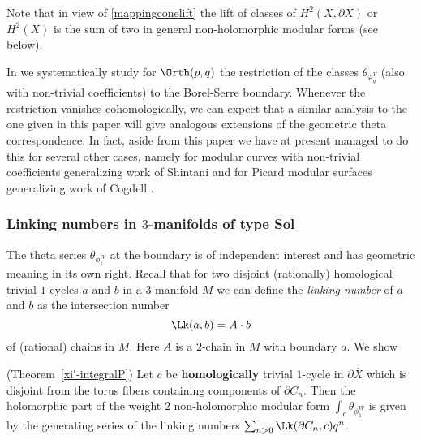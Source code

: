 Note that in view of \eqref{mappingconelift} the lift of classes
of $H^2({X}, \partial {X})$ or $H^2(X)$ is the sum of two in general
non-holomorphic modular forms (see below).

In \cite{FMres} we systematically study for $\Orth(p,q)$ the
restriction of the classes $\theta_{\varphi^V_{q}}$ (also with
non-trivial coefficients) to the Borel-Serre boundary. Whenever the
restriction vanishes cohomologically, we can expect that a similar
analysis to the one given in this paper will give analogous extensions
of the geometric theta correspondence. In fact, aside from this
paper we have at present managed to do this for several other cases,
namely for modular curves with non-trivial coefficients \cite{FMspec}
generalizing work of Shintani \cite{Shintani} and for Picard modular
surfaces \cite{FM-Cogdell} generalizing work of Cogdell \cite{Cogdell}.



\subsubsection*{Linking numbers in $3$-manifolds of type Sol}

The theta series $\theta_{\phi_1^W}$ at the boundary is of independent
interest and has geometric meaning in its own right. Recall that
for two disjoint (rationally) homological trivial $1$-cycles $a$
and $b$ in a $3$-manifold $M$ we can define the {\it linking number}
of $a$ and $b$ as the intersection number
\[
\Lk(a,b) = A \cdot b
\]
of (rational) chains in $M$. Here $A$ is a $2$-chain in $M$ with boundary $a$. We show

\begin{theorem}\label{FM-linking} (Theorem~\ref{xi'-integralP})
Let $c$ be \textbf{homologically} trivial $1$-cycle in $\partial \overline{X}$ which
is disjoint from the torus fibers containing components of $\partial
C_n$. Then the holomorphic part of the weight $2$ non-holomorphic
modular form $\int_c \theta_{\phi_1^W}$ is given by the generating
series of the linking numbers $\sum_{n>0}\Lk(\partial C_n,c) q^n$.
\end{theorem}
